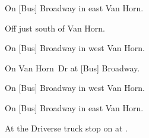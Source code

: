 

\begin{LocationList}

On [Bus] Broadway in east Van Horn.

Off  just south of Van Horn.

On [Bus] Broadway in west Van Horn.

On  Van Horn~Dr at [Bus] Broadway.

On [Bus] Broadway in west Van Horn.

\Location{\TruckService \Service}
On [Bus] Broadway in east Van Horn.

At the Driverse truck stop on  at .

\end{LocationList}
